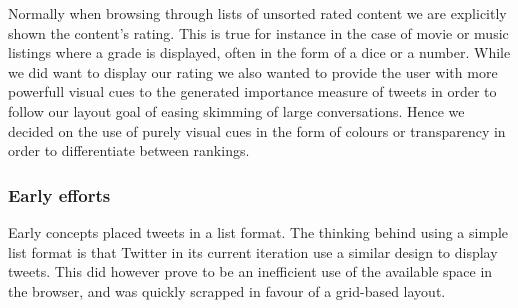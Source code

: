 Normally when browsing through lists of unsorted rated content we are explicitly shown the content's rating. This is true for instance in the case of movie or music listings where a grade is displayed, often in the form of a dice or a number. While we did want to display our rating we also wanted to provide the user with more powerfull visual cues to the generated importance measure of tweets in order to follow our layout goal of easing skimming of large conversations. Hence we decided on the use of purely visual cues in the form of colours or transparency in order to differentiate between rankings.

\subsubsection{Early efforts}
Early concepts placed tweets in a list format. The thinking behind using a simple list format is that Twitter in its current iteration use a similar design to display tweets. This did however prove to be an inefficient use of the available space in the browser, and was quickly scrapped in favour of a grid-based layout.

